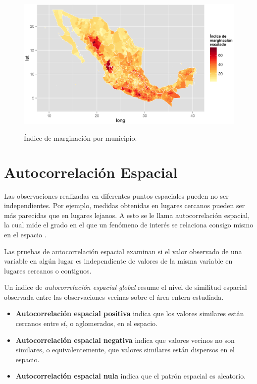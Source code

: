 \begin{itemize}
\begin{enumerate}
\begin{figure}[!ht]
\centering
\includegraphics[width=.9\textwidth]{./maps/mapmarg.png} \\
\caption{ Índice de marginación por municipio.}
\label{map_marg_ej}  
\end{figure}

\end{enumerate}

\end{itemize}


\chapter{Autocorrelación Espacial}

Las observaciones realizadas en diferentes puntos espaciales pueden no ser independientes. Por ejemplo,  medidas obtenidas en lugares cercanos pueden ser más parecidas que en lugares lejanos. A esto se le llama autocorrelación espacial, la cual mide el grado en el que un fenómeno de interés se relaciona consigo mismo en el espacio \citep{clifford1973, clifford1981}.

Las pruebas de autocorrelación espacial examinan si el valor observado de una variable en algún lugar  es independiente de valores de la misma variable en lugares cercanos o  contiguos.

Un índice de \textit{autocorrelación espacial global} resume el nivel de similitud espacial observada entre las observaciones vecinas sobre el área entera estudiada.

\begin{itemize}
\item \textbf{Autocorrelación espacial positiva} indica que los valores similares están cercanos entre sí, o aglomerados, en el espacio.
\item \textbf{Autocorrelación espacial negativa} indica que valores vecinos no son similares, o equivalentemente, que valores similares están dispersos en el espacio.
\item \textbf{Autocorrelación espacial nula} indica que el patrón espacial es aleatorio.
\end{itemize}


